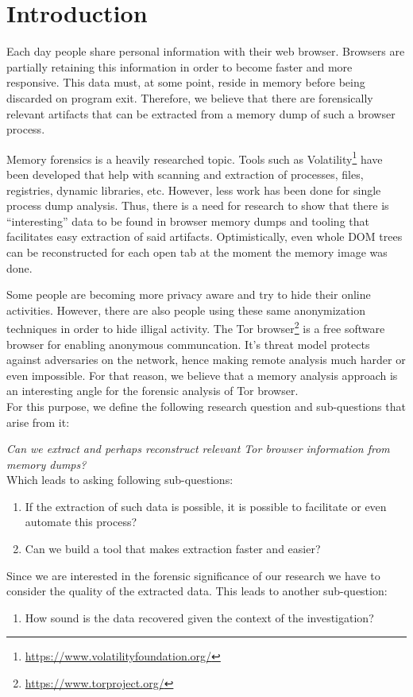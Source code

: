 \section{Introduction}
\label{sec:introduction}
Each day people share personal information with their web
browser. Browsers are partially retaining this information in order to
become faster and more responsive. This data must, at some point, reside
in memory before being discarded on program exit. Therefore, we
believe that there are forensically relevant artifacts that can be
extracted from a memory dump of such a browser process.

Memory forensics is a heavily researched topic. Tools such as
Volatility\footnote{\url{https://www.volatilityfoundation.org/}} have
been developed that help with scanning and extraction of processes,
files, registries, dynamic libraries, etc. However, less work has been
done for single process dump analysis. Thus, there is a need for
research to show that there is ``interesting'' data to be found in
browser memory dumps and tooling that facilitates easy extraction of
said artifacts. Optimistically, even whole DOM trees can be
reconstructed for each open tab at the moment the memory image was
done.

Some people are becoming more privacy aware and try to hide their
online activities. However, there are also people using these same
anonymization techniques in order to hide illigal activity. The Tor
browser\footnote{\url{https://www.torproject.org/}} is a free software
browser for enabling anonymous communcation. It's threat model
protects against adversaries on the network, hence making remote
analysis much harder or even impossible. For that reason, we believe
that a memory analysis approach is an interesting angle for the
forensic analysis of Tor browser.  \\

For this purpose, we define the following research question and
sub-questions that arise from it:

\textit{Can we extract and perhaps reconstruct relevant Tor browser
  information from memory dumps?}  \\

Which leads to asking following sub-questions:
\begin{enumerate}
\item If the extraction of such data is possible, it is possible to
  facilitate or even automate this process?
\item Can we build a tool that makes extraction faster and easier?
\end{enumerate}

Since we are interested in the forensic significance of our research
we have to consider the quality of the extracted data. This leads to
another sub-question:
\begin{enumerate}[resume]
\item How sound is the data recovered given the context of the
  investigation?
\end{enumerate}
